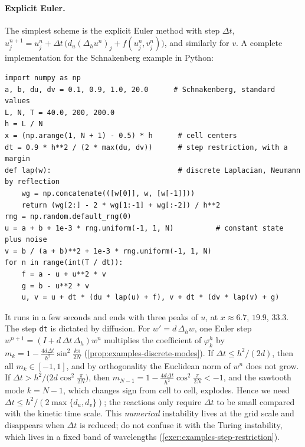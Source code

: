 \paragraph{Explicit Euler.}
The simplest scheme is the explicit Euler method with step $\Delta t$,
$u^{n+1}_j=u^n_j+\Delta t\,\big(d_u(\Delta_hu^n)_j+f(u^n_j,v^n_j)\big)$, and similarly
for $v$. A complete implementation for the Schnakenberg example in Python:
{\footnotesize
\begin{verbatim}
import numpy as np
a, b, du, dv = 0.1, 0.9, 1.0, 20.0      # Schnakenberg, standard values
L, N, T = 40.0, 200, 200.0
h = L / N
x = (np.arange(1, N + 1) - 0.5) * h      # cell centers
dt = 0.9 * h**2 / (2 * max(du, dv))      # step restriction, with a margin
def lap(w):                              # discrete Laplacian, Neumann by reflection
    wg = np.concatenate(([w[0]], w, [w[-1]]))
    return (wg[2:] - 2 * wg[1:-1] + wg[:-2]) / h**2
rng = np.random.default_rng(0)
u = a + b + 1e-3 * rng.uniform(-1, 1, N)          # constant state plus noise
v = b / (a + b)**2 + 1e-3 * rng.uniform(-1, 1, N)
for n in range(int(T / dt)):
    f = a - u + u**2 * v
    g = b - u**2 * v
    u, v = u + dt * (du * lap(u) + f), v + dt * (dv * lap(v) + g)
\end{verbatim}
}
\noindent It runs in a few seconds and ends with three peaks of $u$, at
$x\approx6.7$, $19.9$, $33.3$. The step \texttt{dt} is dictated by diffusion. For
$w'=d\,\Delta_hw$, one Euler step $w^{n+1}=(I+d\,\Delta t\,\Delta_h)w^n$ multiplies the
coefficient of $\varphi^h_k$ by $m_k=1-\frac{4d\Delta t}{h^2}\sin^2\frac{k\pi}{2N}$
(\cref{prop:examples-discrete-modes}). If $\Delta t\le h^2/(2d)$, then all
$m_k\in[-1,1]$, and by orthogonality the Euclidean norm of $w^n$ does not grow. If
$\Delta t>h^2/\big(2d\cos^2\frac{\pi}{2N}\big)$, then
$m_{N-1}=1-\frac{4d\Delta t}{h^2}\cos^2\frac{\pi}{2N}<-1$, and the sawtooth mode $k=N-1$,
which changes sign from cell to cell, explodes. Hence we need
$\Delta t\le h^2/(2\max\{d_u,d_v\})$; the reactions only require $\Delta t$ to be small
compared with the kinetic time scale. This \emph{numerical} instability lives at the
grid scale and disappears when $\Delta t$ is reduced; do not confuse it with the Turing
instability, which lives in a fixed band of wavelengths
(\cref{exer:examples-step-restriction}).

